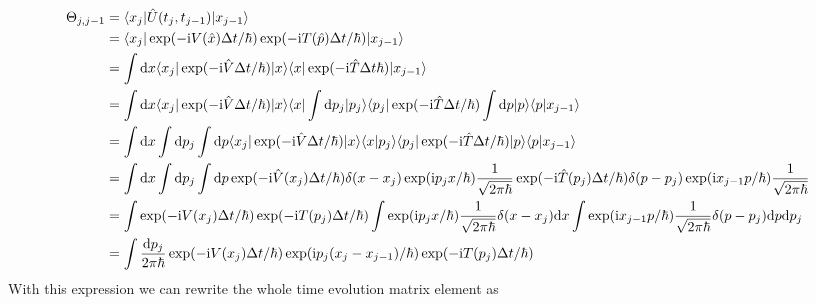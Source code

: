 \documentclass[9pt]{report}
\begin{document}
\begin{align}
\Theta_{j,j-1} &= \langle x_{j}|\hat{U}(t_j,t_{j-1})|x_{j-1}\rangle\\
&= \langle x_j|\exp(-\mathrm{i}V(\hat{x})\Delta t/\hbar)\exp(-\mathrm{i}T(\hat{p})\Delta t/\hbar)|x_{j-1}\rangle\\
&= \int\mathrm{d}x \langle x_j|\exp(-\mathrm{i}\hat{V}\Delta t/\hbar)|x\rangle\langle x|\exp(-\mathrm{i}\hat{T}\Delta t\hbar)|x_{j-1}\rangle\\
&= \int\mathrm{d}x\langle x_j|\exp(-\mathrm{i}\hat{V}\Delta t/\hbar)|x\rangle\langle x|\int\mathrm{d}p_j|p_j\rangle\langle p_j|\exp(-\mathrm{i}\hat{T}\Delta t/\hbar)\int\mathrm{d}p|p\rangle\langle p|x_{j-1}\rangle\\
&= \int\mathrm{d}x\int\mathrm{d}p_j\int\mathrm{d}p\langle x_j|\exp(-\mathrm{i}\hat{V}\Delta t/\hbar)|x\rangle\langle x|p_j\rangle\langle p_j|\exp(-\mathrm{i}\hat{T}\Delta t/\hbar)|p\rangle\langle p|x_{j-1}\rangle\\
&=\int\mathrm{d}x\int\mathrm{d}p_j\int\mathrm{d}p\exp(-\mathrm{i}\hat{V}(x_j)\Delta t/\hbar)\delta(x-x_j)\exp(\mathrm{i}p_j x/\hbar)\frac{1}{\sqrt{2\pi\hbar}}\exp(-\mathrm{i}\hat{T}(p_j)\Delta t/\hbar)\delta(p-p_j)\exp(\mathrm{i}x_{j-1}p/\hbar)\frac{1}{\sqrt{2\pi\hbar}}\notag\\
&= \int\exp(-\mathrm{i}V(x_j)\Delta t/\hbar)\exp(-\mathrm{i}T(p_j)\Delta t/\hbar)\int\exp(\mathrm{i}p_j x/\hbar)\frac{1}{\sqrt{2\pi\hbar}}\delta(x-x_j)\mathrm{d}x\int\exp(\mathrm{i}x_{j-1}p/\hbar)\frac{1}{\sqrt{2\pi\hbar}}\delta(p-p_j)\mathrm{d}p\mathrm{d}p_j\notag\\
&= \int\frac{\mathrm{d}p_j}{2\pi\hbar}\exp(-\mathrm{i}V(x_j)\Delta t/\hbar)\exp(\mathrm{i}p_j(x_j-x_{j-1})/\hbar)\exp(-\mathrm{i}T(p_j)\Delta t/\hbar)
\end{align}
With this expression we can rewrite the whole time evolution matrix element as
\end{document}
